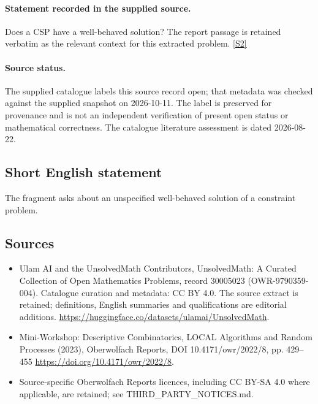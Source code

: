 \documentclass[11pt]{article}
\begin{document}
\paragraph{Statement recorded in the supplied source.}
Does a CSP have a well-behaved solution? The report passage is retained verbatim as the relevant context for this extracted problem. \href{https://doi.org/10.4171/owr/2022/8}{[S2]}
\paragraph{Source status.}
The supplied catalogue labels this source record open; that metadata was checked against the supplied snapshot on 2026-10-11. The label is preserved for provenance and is not an independent verification of present open status or mathematical correctness. The catalogue literature assessment is dated 2026-08-22.
\subsection{Short English statement}
The fragment asks about an unspecified well-behaved solution of a constraint problem.
\subsection{Sources}
\begin{itemize}
\item[S1] Ulam AI and the UnsolvedMath Contributors, UnsolvedMath: A Curated Collection of Open Mathematics Problems, record 30005023 (OWR-9790359-004). Catalogue curation and metadata: CC BY 4.0. The source extract is retained; definitions, English summaries and qualifications are editorial additions.
\url{https://huggingface.co/datasets/ulamai/UnsolvedMath}.
\item[S2] Mini-Workshop: Descriptive Combinatorics, LOCAL Algorithms and Random Processes (2023), Oberwolfach Reports, DOI 10.4171/owr/2022/8, pp. 429--455
\url{https://doi.org/10.4171/owr/2022/8}.
\item Source-specific Oberwolfach Reports licences, including CC BY-SA 4.0 where applicable, are retained; see THIRD\_PARTY\_NOTICES.md.
\end{itemize}
\end{document}

